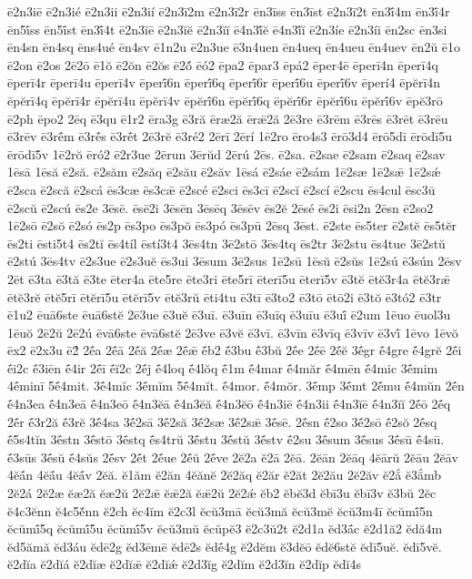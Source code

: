 {ē2n3iē
ē2n3ié
ē2n3ii
ē2n3ií
ē2n3ī2m
ē2n3ī2r
ēn3īss
ēn3īst
ē2n3ī2t
ēn3ī́4m
ēn3ī́4r
ēn5ī́ss
ēn5ī́st
ēn3ī́4t
ē2n3ĭē
ē2n3ĭĕ
ē2n3ĭĭ
ē4n3ĭ́ĕ
ē4n3ĭ́ĭ
ē2n3íe
ē2n3íi
ēn2sc
ēn3si
ēn4sn
ēn4sq
ēns4ué
ēn4sv
ē1n2u
ē2n3ue
ē3n4uen
ēn4ueq
ēn4ueu
ēn4uev
ēn2ŭ
ē1o
ē2on
ē2os
2ē2ō
ē1ŏ
ē2ŏn
ē2ŏs
ē2ŏ́
ēó2
ēpa2
ēpar3
ēpá2
ēper4ē
ēperī4n
ēperī4q
ēperī4r
ēperī4u
ēperī4v
ēperī́6n
ēperī́6q
ēperī́6r
ēperī́6u
ēperī́6v
ēperí4
ēpĕrī4n
ēpĕrī4q
ēpĕrī4r
ēpĕrī4u
ēpĕrī4v
ēpĕrī́6n
ēpĕrī́6q
ēpĕrī́6r
ēpĕrī́6u
ēpĕrī́6v
ēpĕ3rō
ē2ph
ēpo2
2ēq
ē3qu
ē1r2
ēra3g
ē3ră
ēræ2ă
ērǣ2ă
2ē3re
ē3rēm
ē3rēs
ē3rēt
ē3rēu
ē3rēv
ē3rḗm
ē3rḗs
ē3rḗt
2ē3rĕ
ē3ré2
2ērī
2ērí
1ē2ro
ēro4s3
ērō3d4
ērō5dī
ērōdī5u
ērōdī5v
1ē2rŏ
ēró2
ē2r3ue
2ērun
3ērŭd
2ērú
2ēs.
ē2sa.
ē2sae
ē2sam
ē2saq
ē2sav
1ēsā
1ēsă
ē2să.
ē2săm
ē2săq
ē2său
ē2săv
1ēsá
ē2sáe
ē2sám
1ē2sæ
1ē2sǣ
1ē2sǽ
ē2sca
ē2scă
ē2scá
ēs3cæ
ēs3cǣ
ē2scé
ē2sci
ēs3cī
ē2scĭ
ē2scí
ē2scu
ēs4cul
ēsc3ū
ē2scŭ
ē2scú
ēs2e
3ēsē.
ēsē2i
3ēsēn
3ēsēq
3ēsēv
ēs2ĕ
2ēsé
ēs2i
ēsi2n
2ēsn
ē2so2
1ē2sō
ē2sŏ
ē2só
ēs2p
ēs3po
ēs3pŏ
ēs3pó
ēs3pū
2ēsq
3ēst.
ē2ste
ēs5ter
ē2stĕ
ēs5tĕr
ēs2ti
ēsti5t4
ēs2tĭ
ēs4tíl
ēstí3t4
3ēs4tn
3ē2stō
3ēs4tq
ēs2tr
3ē2stu
ēs4tue
3ē2stŭ
ē2stú
3ēs4tv
ē2s3ue
ē2s3uĕ
ēs3ui
3ēsum
3ē2sus
1ē2sū
1ēsŭ
ē2sŭs
1ē2sú
ē3sún
2ēsv
2ēt
ē3ta
ē3tă
ē3te
ēter4a
ēte5re
ēte3ri
ēte5rī
ēterī5u
ēterī5v
ē3tĕ
ētĕ3r4a
ētĕ3rǣ
ētĕ3rĕ
ētĕ5rī
ētĕrī5u
ētĕrī5v
ētĕ3rŭ
ēti4tu
ē3tī
ē3to2
ē3tō
ētō2i
ē3tŏ
ē3tó2
ē3tr
ē1u2
ēuā6ste
ēuā6stĕ
2ē3ue
ē3uĕ
ē3uī.
ē3uīn
ē3uīq
ē3uīu
ē3uī́
ē2um
1ēuo
ēuol3u
1ēuŏ
2ē2ŭ
2ē2ú
ēvā6ste
ēvā6stĕ
2ē3ve
ē3vĕ
ē3vī.
ē3vīn
ē3vīq
ē3vīv
ē3vī́
1ēvo
1ēvŏ
ēx2
ē2x3u
ē2́
2ḗa
2ḗā
2ḗă
2ḗæ
2ḗǣ
ḗb2
ḗ3bu
ḗ3bŭ
2ḗe
2ḗē
2ḗĕ
3ḗgr
ḗ4gre
ḗ4grĕ
2ḗi
ḗi2c
ḗ3iēn
ḗ4ir
2ḗī
ḗĭ2c
2ḗj
ḗ4loq
ḗ4lŏq
ḗ1m
ḗ4mar
ḗ4măr
ḗ4mēn
ḗ4mic
3ḗmim
4ḗminī
5ḗ4mit.
3ḗ4mĭc
3ḗmĭm
5ḗ4mĭt.
ḗ4mor.
ḗ4mŏr.
3ḗmp
3ḗmt
2ḗmu
ḗ4mŭn
2ḗn
ḗ4n3ea
ḗ4n3eā
ḗ4n3eō
ḗ4n3ĕā
ḗ4n3ĕă
ḗ4n3ĕō
ḗ4n3iē
ḗ4n3ii
ḗ4n3ĭē
ḗ4n3ĭĭ
2ḗō
2ḗq
2ḗr
ḗ3r2ă
ḗ3rĕ
3ḗ4sa
3ḗ2sā
3ḗ2să
3ḗ2sæ
3ḗ2sǣ
3ḗsē.
2ḗsn
ḗ2so
3ḗ2sō
ḗ2sŏ
2ḗsq
ḗ5s4tĭn
3ḗstn
3ḗstō
3ḗstq
ḗs4trŭ
3ḗstu
3ḗstŭ
3ḗstv
ḗ2su
3ḗsum
3ḗsus
3ḗsū
ḗ4sū.
ḗ3sūs
3ḗsŭ
ḗ4sŭs
2ḗsv
2ḗt
2ḗue
2ḗŭ
2ḗve
2ĕ2a
ĕ2ā
2ĕā.
2ĕān
2ĕāq
4ĕārŭ
2ĕāu
2ĕāv
4ĕā́n
4ĕā́u
4ĕā́v
2ĕă.
ĕ1ăm
ĕ2ăn
4ĕănĕ
2ĕ2ăq
ĕ2ăr
ĕ2ăt
2ĕ2ău
2ĕ2ăv
ĕ2ắ
ĕ3ắmb
2ĕ2á
2ĕ2æ
ĕæ2ă
ĕæ2ŭ
2ĕ2ǣ
ĕǣ2ă
ĕǣ2ŭ
2ĕ2ǽ
ĕb2
ĕbĕ3d
ĕbī3u
ĕbī3v
ĕ3bŭ
2ĕc
ĕ4c3ĕnn
ĕ4c5ĕ́nn
ĕ2ch
ĕc4ĭm
ĕ2c3l
ĕcŭ3mā
ĕcŭ3mă
ĕcŭ3mĕ
ĕcŭ3m4ī
ĕcŭmī́5n
ĕcŭmī́5q
ĕcŭmī́5u
ĕcŭmī́5v
ĕcŭ3mŭ
ĕcŭpĕ3
ĕ2c3ŭ2t
ĕ2d1a
ĕd3ā́c
ĕ2d1ă2
ĕdă4m
ĕd5ămă
ĕd3áu
ĕdē2g
ĕd3ēmē
ĕdē2s
ĕdḗ4g
ĕ2dĕm
ĕ3dĕō
ĕdĕ6stĕ
ĕdī5uĕ.
ĕdī5vĕ.
ĕ2dĭa
ĕ2dĭá
ĕ2dĭæ
ĕ2dĭǣ
ĕ2dĭǽ
ĕ2d3ĭg
ĕ2dĭm
ĕ2d3ĭn
ĕ2dĭp
ĕdĭ4s
}
